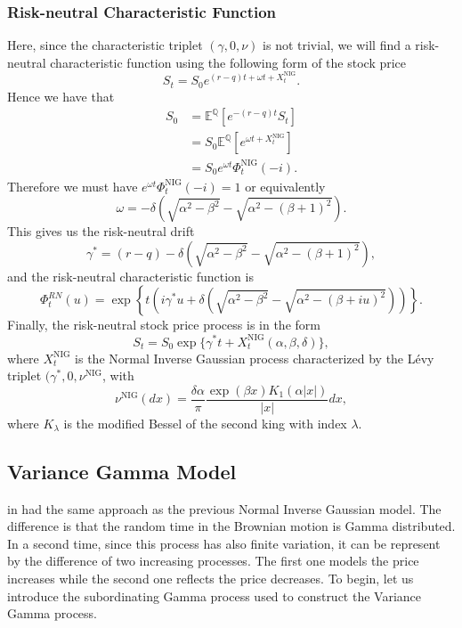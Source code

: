 \subsubsection*{Risk-neutral Characteristic Function}
Here, since the characteristic triplet $(\gamma,0,\nu)$ is not trivial, we will find a risk-neutral characteristic function using the following form of the stock price
$$S_t=S_0 e^{(r-q)t+\omega t +X_t^\text{NIG}}.$$
Hence we have that
\begin{align*}
S_0&=\mathbb{E}^\mathbb{Q}\left[e^{-(r-q)t}S_t\right]\\
&=S_0\mathbb{E}^\mathbb{Q}\left[e^{\omega t + X^\text{NIG}_t}\right]\\
&=S_0e^{\omega t}\Phi_t^\text{NIG}(-i).
\end{align*}
Therefore we must have $e^{\omega t}\Phi^\text{NIG}_t(-i) = 1$ or equivalently
$$\omega = - \delta \left(\sqrt{\alpha^2-\beta^2}-\sqrt{\alpha^2-(\beta+1)^2}\right).$$
This gives us the risk-neutral drift
$$\gamma^\ast=(r-q) -\delta \left(\sqrt{\alpha^2-\beta^2}-\sqrt{\alpha^2-(\beta+1)^2}\right),$$
and the risk-neutral characteristic function is
$$\Phi^{RN}_t(u) = \exp\left\{t\left(i\gamma^\ast u + \delta \left(\sqrt{\alpha^2-\beta^2}-\sqrt{\alpha^2-(\beta+iu)^2}\right)\right)\right\}.$$
Finally, the risk-neutral stock price process is in the form
$$S_t = S_0 \exp\{\gamma^\ast t + X_t^\text{NIG} (\alpha,\beta,\delta)\},$$
where $X_t^\text{NIG}$ is the Normal Inverse Gaussian process characterized by the L\'evy triplet $(\gamma^\ast,0,\nu^\text{NIG}$, with
$$\nu^\text{NIG}(dx) = \frac{\delta \alpha}{\pi}\frac{\exp(\beta x)K_1(\alpha|x|)}{|x|}dx,$$
where $K_\lambda$ is the modified Bessel of the second king with index $\lambda$.

\subsection{Variance Gamma Model}
\citeauthor{MCC98} in \citeyear{MCC98} had the same approach as the previous Normal Inverse Gaussian model. The difference is that the random time in the Brownian motion is Gamma distributed. In a second time, since this process has also finite variation, it can be represent by the difference of two increasing processes. The first one models the price increases while the second one reflects the price decreases. To begin, let us introduce the subordinating Gamma process used to construct the Variance Gamma process.


